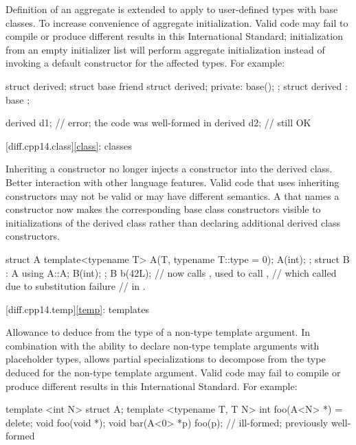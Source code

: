 \change
Definition of an aggregate is extended
to apply to user-defined types with base classes.
\rationale
To increase convenience of aggregate initialization.
\effect
Valid \CppXIV{} code may fail to compile or produce different results in this
International Standard; initialization from an empty initializer list will
perform aggregate initialization instead of invoking a default constructor
for the affected types.
For example:
\begin{codeblock}
struct derived;
struct base {
  friend struct derived;
private:
  base();
};
struct derived : base {};

derived d1{};       // error; the code was well-formed in \CppXIV{}
derived d2;         // still OK
\end{codeblock}

[diff.cpp14.class]{\ref{class}: classes}

\change
Inheriting a constructor no longer injects a constructor into the derived class.
\rationale
Better interaction with other language features.
\effect
Valid \CppXIV{} code that uses inheriting constructors may not be valid
or may have different semantics. A 
that names a constructor now makes the corresponding base class constructors
visible to initializations of the derived class
rather than declaring additional derived class constructors.
\begin{codeblock}
struct A {
  template<typename T> A(T, typename T::type = 0);
  A(int);
};
struct B : A {
  using A::A;
  B(int);
};
B b(42L);           // now calls , used to call ,
                    // which called  due to substitution failure
                    // in .
\end{codeblock}

[diff.cpp14.temp]{\ref{temp}: templates}

\change
Allowance to deduce from the type of a non-type template argument.
\rationale
In combination with the ability to declare
non-type template arguments with placeholder types,
allows partial specializations to decompose
from the type deduced for the non-type template argument.
\effect
Valid \CppXIV{} code may fail to compile
or produce different results in this International Standard.
For example:
\begin{codeblock}
template <int N> struct A;
template <typename T, T N> int foo(A<N> *) = delete;
void foo(void *);
void bar(A<0> *p) {
  foo(p);           // ill-formed; previously well-formed
}
\end{codeblock}


